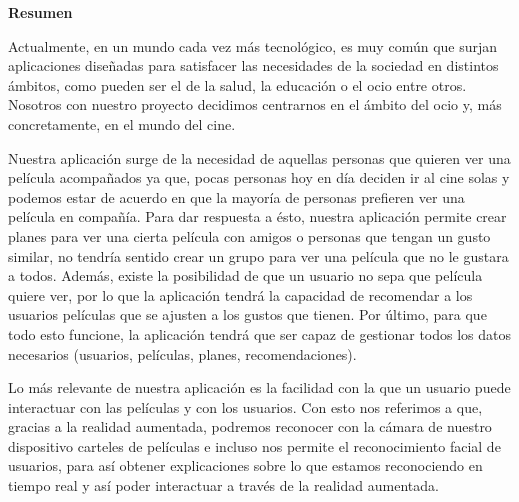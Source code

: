 
\newpage

\thispagestyle{empty}

\begin{center}

{\bf \Huge Resumen}

  \end{center}
\vspace{1cm}

Actualmente, en un mundo cada vez más tecnológico, es muy común que surjan aplicaciones diseñadas
para satisfacer las necesidades de la sociedad en distintos ámbitos, como pueden ser el de la salud, la educación o el ocio entre otros. Nosotros con nuestro proyecto decidimos centrarnos en el ámbito del ocio y, más concretamente, en el mundo del cine.

Nuestra aplicación surge de la necesidad de aquellas personas que quieren ver una película acompañados ya que, pocas personas hoy en día deciden ir al cine solas y 
podemos estar de acuerdo en que la mayoría de personas prefieren ver una película en compañía.
Para dar respuesta a ésto, nuestra aplicación permite crear planes para ver una cierta película con amigos o personas que tengan un gusto similar, no tendría sentido crear un grupo para ver una película que no le gustara a todos.
Además, existe la posibilidad de que un usuario no sepa que película quiere ver, por lo que la aplicación tendrá la capacidad
de recomendar a los usuarios películas que se ajusten a los gustos que tienen. Por último, para que todo esto funcione, la aplicación tendrá que ser capaz de 
gestionar todos los datos necesarios (usuarios, películas, planes, recomendaciones).

Lo más relevante de nuestra aplicación es la facilidad con la que un usuario puede interactuar con las películas y con los usuarios. Con esto nos referimos a que, gracias a la realidad aumentada,
podremos reconocer con la cámara de nuestro dispositivo carteles de películas e incluso nos permite el reconocimiento facial de usuarios, para así
obtener explicaciones sobre lo que estamos reconociendo en tiempo real y así poder interactuar a 
través de la realidad aumentada.
\vspace{1cm}


